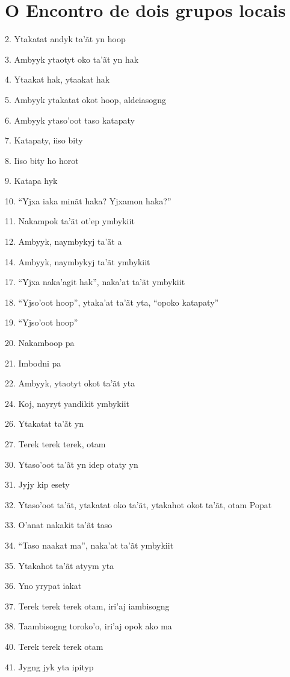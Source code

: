 \section{O Encontro de dois grupos locais}

2. Ytakatat andyk ta'ãt yn hoop

3. Ambyyk ytaotyt oko ta'ãt yn hak

4. Ytaakat hak, ytaakat hak

5. Ambyyk ytakatat okot hoop, aldeiasogng

6. Ambyyk ytaso'oot taso katapaty

7. Katapaty, iiso bity

8. Iiso bity ho horot

9. Katapa hyk

10. ``Yjxa iaka minãt haka? Yjxamon haka?''

11. Nakampok ta'ãt ot'ep ymbykiit

12. Ambyyk, naymbykyj ta'ãt a

14. Ambyyk, naymbykyj ta'ãt ymbykiit

17. ``Yjxa naka'agit hak'', naka'at ta'ãt ymbykiit

18. ``Yjso'oot hoop'', ytaka'at ta'ãt yta, ``opoko katapaty''

19. ``Yjso'oot hoop''

20. Nakamboop pa

21. Imbodni pa

22. Ambyyk, ytaotyt okot ta'ãt yta

24. Koj, nayryt yandikit ymbykiit

26. Ytakatat ta'ãt yn

27. Terek terek terek, otam

30. Ytaso'oot ta'ãt yn idep otaty yn

31. Jyjy kip esety

32. Ytaso'oot ta'ãt, ytakatat oko ta'ãt, ytakahot okot ta'ãt, otam Popat

33. O'anat nakakit ta'ãt taso

34. ``Taso naakat ma'', naka'at ta'ãt ymbykiit

35. Ytakahot ta'ãt atyym yta

36. Yno yrypat iakat

37. Terek terek terek otam, iri'aj iambisogng

38. Taambisogng toroko'o, iri'aj opok ako ma

40. Terek terek terek otam

41. Jygng jyk yta ipityp

